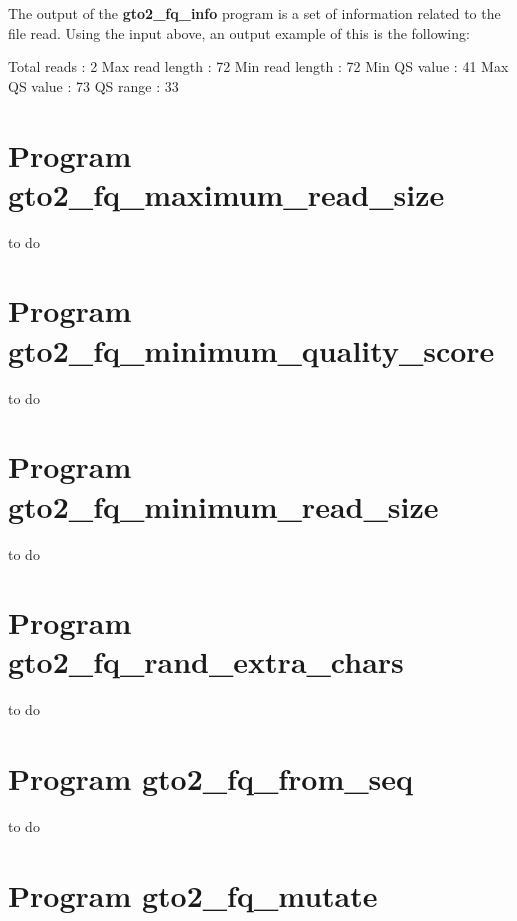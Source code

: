 \documentclass[11pt,]{krantz}
\newenvironment{Shaded}{\begin{snugshade}}{\end{snugshade}}
\newcommand{\ExtensionTok}[1]{#1}
\newcommand{\NormalTok}[1]{#1}
\begin{document}
The output of the \textbf{gto2\_fq\_info} program is a set of
information related to the file read. Using the input above, an output
example of this is the following:

\begin{Shaded}
\begin{Highlighting}[]
\ExtensionTok{Total}\NormalTok{ reads     : 2}
\ExtensionTok{Max}\NormalTok{ read length : 72}
\ExtensionTok{Min}\NormalTok{ read length : 72}
\ExtensionTok{Min}\NormalTok{ QS value    : 41}
\ExtensionTok{Max}\NormalTok{ QS value    : 73}
\ExtensionTok{QS}\NormalTok{ range        : 33}
\end{Highlighting}
\end{Shaded}

\section{Program
gto2\_fq\_maximum\_read\_size}\label{program-gto2_fq_maximum_read_size}

to do

\section{Program
gto2\_fq\_minimum\_quality\_score}\label{program-gto2_fq_minimum_quality_score}

to do

\section{Program
gto2\_fq\_minimum\_read\_size}\label{program-gto2_fq_minimum_read_size}

to do

\section{Program
gto2\_fq\_rand\_extra\_chars}\label{program-gto2_fq_rand_extra_chars}

to do

\section{Program gto2\_fq\_from\_seq}\label{program-gto2_fq_from_seq}

to do

\section{Program gto2\_fq\_mutate}\label{program-gto2_fq_mutate}
\end{document}
